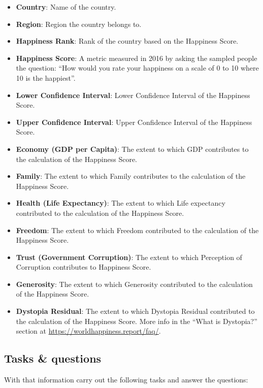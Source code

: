 \documentclass[]{book}
\providecommand{\tightlist}{%
  \setlength{\itemsep}{0pt}\setlength{\parskip}{0pt}}
\begin{document}
\begin{itemize}
\tightlist
\item
  \textbf{Country}: Name of the country.
\item
  \textbf{Region}: Region the country belongs to.
\item
  \textbf{Happiness Rank}: Rank of the country based on the Happiness
  Score.
\item
  \textbf{Happiness Score}: A metric measured in 2016 by asking the
  sampled people the question: ``How would you rate your happiness on a
  scale of 0 to 10 where 10 is the happiest''.
\item
  \textbf{Lower Confidence Interval}: Lower Confidence Interval of the
  Happiness Score.
\item
  \textbf{Upper Confidence Interval}: Upper Confidence Interval of the
  Happiness Score.
\item
  \textbf{Economy (GDP per Capita)}: The extent to which GDP contributes
  to the calculation of the Happiness Score.
\item
  \textbf{Family}: The extent to which Family contributes to the
  calculation of the Happiness Score.
\item
  \textbf{Health (Life Expectancy)}: The extent to which Life expectancy
  contributed to the calculation of the Happiness Score.
\item
  \textbf{Freedom}: The extent to which Freedom contributed to the
  calculation of the Happiness Score.
\item
  \textbf{Trust (Government Corruption)}: The extent to which Perception
  of Corruption contributes to Happiness Score.
\item
  \textbf{Generosity}: The extent to which Generosity contributed to the
  calculation of the Happiness Score.
\item
  \textbf{Dystopia Residual}: The extent to which Dystopia Residual
  contributed to the calculation of the Happiness Score. More info in
  the ``What is Dystopia?'' section at
  \url{https://worldhappiness.report/faq/}.
\end{itemize}

\subsection{Tasks \& questions}\label{tasks-questions}

With that information carry out the following tasks and answer the
questions:
\end{document}
